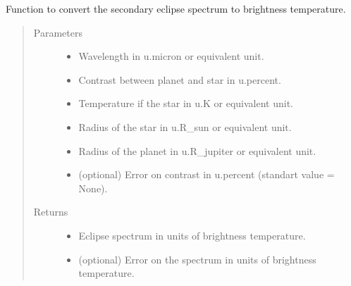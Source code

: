 \documentclass[a4paper,11pt,english]{sphinxmanual}
\begin{document}

\begin{fulllineitems}
\label{\detokenize{cascade.exoplanet_tools:cascade.exoplanet_tools.exoplanet_tools.convert_spectrum_to_brighness_temperature}}
Function to convert the secondary eclipse spectrum to brightness
temperature.
\begin{quote}\begin{description}
\item[{Parameters}] \leavevmode\begin{itemize}
\item {} 
 \textendash{} Wavelength in u.micron or equivalent unit.

\item {} 
 \textendash{} Contrast between planet and star in u.percent.

\item {} 
 \textendash{} Temperature if the star in u.K or equivalent unit.

\item {} 
 \textendash{} Radius of the star in u.R\_sun or equivalent unit.

\item {} 
 \textendash{} Radius of the planet in u.R\_jupiter or equivalent unit.

\item {} 
 \textendash{} (optional) Error on contrast in u.percent (standart value = None).

\end{itemize}

\item[{Returns}] \leavevmode
\begin{itemize}
\item {} 
 \textendash{} Eclipse spectrum in units of brightness temperature.

\item {} 
 \textendash{} (optional) Error on the spectrum in units of brightness temperature.

\end{itemize}


\end{description}\end{quote}

\end{fulllineitems}
\end{document}
